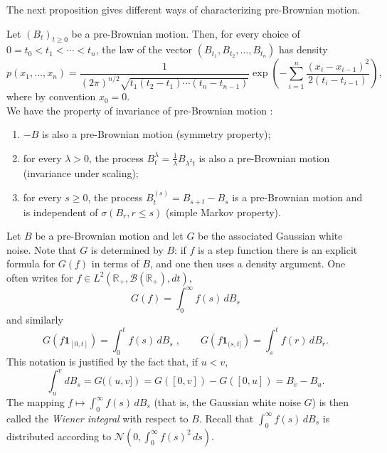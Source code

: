 \documentclass[../Main.tex]{subfiles}
\begin{document}
The next proposition gives different ways of characterizing pre-Brownian motion.

Let $(B_t)_{t\geq 0}$ be a pre-Brownian motion. Then, for every choice of $0=t_0<t_1<\cdots<t_n$, the law of the vector $(B_{t_1},B_{t_2},\dots,B_{t_n})$ has density
\[ p(x_1,\dots,x_n) = \frac{1}{(2\pi)^{n/2}\sqrt{t_1(t_2-t_1)\cdots(t_n-t_{n-1})}}\exp\left(-\sum_{i=1}^n \frac{(x_i-x_{i-1})^2}{2(t_i-t_{i-1})}\right), \]
where by convention $x_0=0$. \\
We have the property of invariance of pre-Brownian motion : 
\begin{enumerate}
    \item $-B$ is also a pre-Brownian motion (symmetry property);
    \item for every $\lambda>0$, the process $B_t^\lambda = \frac{1}{\lambda}B_{\lambda^2 t}$ is also a pre-Brownian motion (invariance under scaling);
    \item for every $s\geq 0$, the process $B_t^{(s)} = B_{s+t}-B_s$ is a pre-Brownian motion and is independent of $\sigma(B_r, r\leq s)$ (simple Markov property).
\end{enumerate}

Let $B$ be a pre-Brownian motion and let $G$ be the associated Gaussian white noise. Note that $G$ is determined by $B$: if $f$ is a step function there is an explicit formula for $G(f)$ in terms of $B$, and one then uses a density argument. One often writes for $f\in L^2(\mathbb R_+,\mathcal B(\mathbb R_+),dt)$,
\[ G(f) = \int_0^\infty f(s)\,dB_s \]
and similarly
\[
G(f\mathbf 1_{[0,t]}) = \int_0^t f(s)\,dB_s\;,\qquad G(f\mathbf 1_{(s,t]}) = \int_s^t f(r)\,dB_r.
\]
This notation is justified by the fact that, if $u<v$,
\[ \int_u^v dB_s = G((u,v]) = G([0,v]) - G([0,u]) = B_v - B_u. \]
The mapping $f\mapsto \int_0^\infty f(s)\,dB_s$ (that is, the Gaussian white noise $G$) is then called the \emph{Wiener integral} with respect to $B$. Recall that $\int_0^\infty f(s)\,dB_s$ is distributed according to $\mathcal N(0,\int_0^\infty f(s)^2\,ds)$.
 
\end{document}
